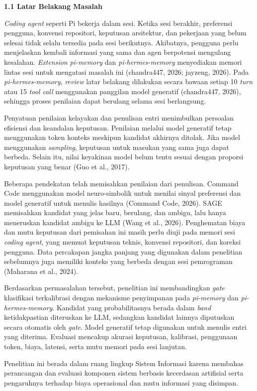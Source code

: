 \documentclass[12pt,a4paper]{article}
\newcommand{\asing}[1]{\textit{#1}}
\newcommand{\pim}{\textit{pi-memory}}
\newcommand{\phm}{\textit{pi-hermes-memory}}
\newcommand{\subbab}[2]{%
  \par\vspace{0.8em}\phantomsection\label{#2}%
  \noindent\textbf{#1}\par\nopagebreak\vspace{0.3em}}
\begin{document}
\subbab{1.1 Latar Belakang Masalah}{sec:1.1}

\asing{Coding agent} seperti Pi bekerja dalam sesi. Ketika sesi berakhir, preferensi pengguna, konvensi repositori, keputusan arsitektur, dan pekerjaan yang belum selesai tidak selalu tersedia pada sesi berikutnya. Akibatnya, pengguna perlu menjelaskan kembali informasi yang sama dan agen berpotensi mengulang kesalahan. \asing{Extension} \pim{} dan \phm{} menyediakan memori lintas sesi untuk mengatasi masalah ini (chandra447, 2026; jayzeng, 2026). Pada \phm{}, \asing{review} latar belakang dilakukan secara bawaan setiap 10 \asing{turn} atau 15 \asing{tool call} menggunakan panggilan model generatif (chandra447, 2026), sehingga proses penilaian dapat berulang selama sesi berlangsung.

Penyatuan penilaian kelayakan dan penulisan entri menimbulkan persoalan efisiensi dan keandalan keputusan. Penilaian melalui model generatif tetap menggunakan token konteks meskipun kandidat akhirnya ditolak. Jika model menggunakan \asing{sampling}, keputusan untuk masukan yang sama juga dapat berbeda. Selain itu, nilai keyakinan model belum tentu sesuai dengan proporsi keputusan yang benar (Guo et al., 2017).

Beberapa pendekatan telah memisahkan penilaian dari penulisan. Command Code menggunakan model neuro-simbolik untuk menilai sinyal preferensi dan model generatif untuk menulis hasilnya (Command Code, 2026). SAGE memisahkan kandidat yang jelas baru, berulang, dan ambigu, lalu hanya meneruskan kandidat ambigu ke LLM (Wang et al., 2026). Penghematan biaya dan mutu keputusan dari pemisahan ini masih perlu diuji pada memori sesi \asing{coding agent}, yang memuat keputusan teknis, konvensi repositori, dan koreksi pengguna. Data percakapan jangka panjang yang digunakan dalam penelitian sebelumnya juga memiliki konteks yang berbeda dengan sesi pemrograman (Maharana et al., 2024).

Berdasarkan permasalahan tersebut, penelitian ini membandingkan \asing{gate} klasifikasi terkalibrasi dengan mekanisme penyimpanan pada \pim{} dan \phm{}. Kandidat yang probabilitasnya berada dalam \asing{band} ketidakpastian diteruskan ke LLM, sedangkan kandidat lainnya diputuskan secara otomatis oleh \asing{gate}. Model generatif tetap digunakan untuk menulis entri yang diterima. Evaluasi mencakup akurasi keputusan, kalibrasi, penggunaan token, biaya, latensi, serta mutu memori pada sesi lanjutan.

Penelitian ini berada dalam ruang lingkup Sistem Informasi karena membahas perancangan dan evaluasi komponen sistem berbasis kecerdasan artifisial serta pengaruhnya terhadap biaya operasional dan mutu informasi yang disimpan.
\end{document}
